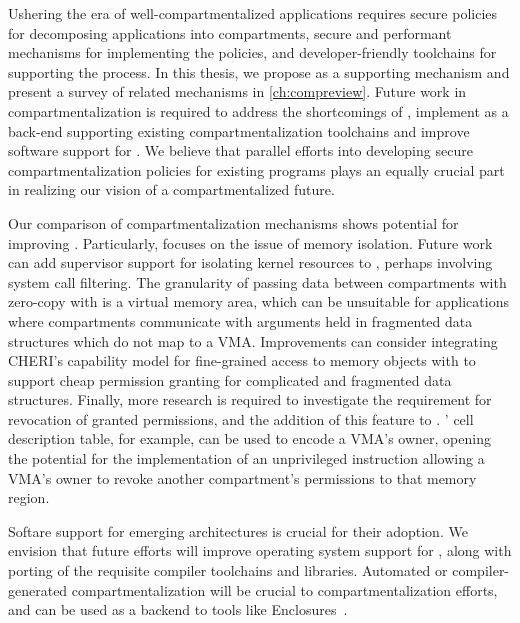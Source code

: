 Ushering the era of well-compartmentalized applications requires 
secure policies for decomposing applications into compartments,
secure and performant mechanisms for implementing the policies, and
developer-friendly toolchains for supporting the process.
In this thesis, we propose \seccells as a supporting mechanism and
present a survey of related mechanisms in \autoref{ch:compreview}.
Future work in compartmentalization is required to address the
shortcomings of \seccells, implement \seccells as a back-end supporting
existing compartmentalization toolchains and
improve software support for \seccells.
We believe that parallel efforts into developing secure compartmentalization
policies for existing programs plays an equally crucial part in realizing
our vision of a compartmentalized future.

Our comparison of compartmentalization mechanisms shows potential
for improving \seccells.
Particularly, \seccells focuses on the issue of memory isolation.
Future work can add supervisor support for isolating kernel resources
to \seccells, perhaps involving system call filtering.
The granularity of passing data between compartments with zero-copy with
\seccells is a virtual memory area, which can be unsuitable for 
applications where compartments communicate with arguments held in 
fragmented data structures which do not map to a VMA.
Improvements can consider integrating CHERI's capability model for
fine-grained access to memory objects with \seccells to support cheap 
permission granting for complicated and fragmented data structures.
Finally, more research is required to investigate the requirement for
revocation of granted permissions, and the addition of this feature
to \seccells.
\seccells' cell description table, for example, can be used to encode
a VMA's owner, opening the potential for the implementation of an
unprivileged instruction allowing a VMA's owner to revoke another
compartment's permissions to that memory region.

Softare support for emerging architectures is crucial for their adoption.
We envision that future efforts will improve operating system support for
\seccells, along with porting of the requisite compiler toolchains and
libraries.
Automated or compiler-generated compartmentalization will be crucial to
compartmentalization efforts, and \seccells can be used as a backend to
tools like Enclosures~\cite{GhosnKPLB21}.